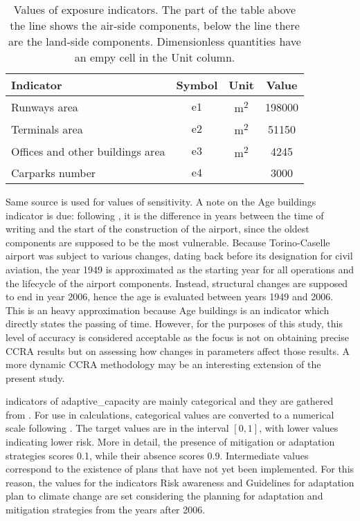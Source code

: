 \begin{table}[h]
  \renewcommand*{\arraystretch}{1.5}
  \centering
  \caption{Values of exposure indicators. The part of the table above the line shows the air-side components, below the line there are the land-side components. Dimensionless quantities have an empy cell in the Unit column.}
  \label{tab:values_exposure}
  \begin{tabular}{p{}ccc}
    Indicator                        & Symbol        & Unit                 & Value  \\
    \hline
    Runways area                     & $\mathrm{e1}$ & \unit{\square\metre} & 198000 \\
    \hline
    Terminals area                   & $\mathrm{e2}$ & \unit{\square\metre} & 51150  \\
    Offices and other buildings area & $\mathrm{e3}$ & \unit{\square\metre} & 4245   \\
    Carparks number                  & $\mathrm{e4}$ &                      & 3000   \\
  \end{tabular}
\end{table}

Same source is used for values of \gls{sensitivity}. A note on the {Age buildings} indicator is due: following \cite[5]{2022DeVivoRiskAssessment}, it is the difference in years between the time of writing and the start of the construction of the airport, since the oldest components are supposed to be the most vulnerable. Because Torino-Caselle airport was subject to various changes, dating back before its designation for civil aviation, the year 1949 is approximated as the starting year for all operations and the lifecycle of the airport components. Instead, structural changes are supposed to end in year 2006, hence the age is evaluated between years 1949 and 2006. This is an heavy approximation because {Age buildings} is an indicator which directly states the passing of time. However, for the purposes of this study, this level of accuracy is considered acceptable as the focus is not on obtaining precise \gls{CCRA} results but on assessing how changes in parameters affect those results.
A more dynamic \gls{CCRA} methodology may be an interesting extension of the present study.

\Glspl{indicator} of \gls{adaptive_capacity} are mainly categorical and they are gathered from \cite[66-79]{2015PudduCorporateSocial}. For use in calculations, categorical values are converted to a numerical scale following \cite[6]{2023DeVivoClimate-RiskAssessment}. The target values are in the interval $[0, 1]$, with lower values indicating lower \gls{risk}. More in detail, the presence of mitigation or adaptation strategies scores \num{0.1}, while their absence scores \num{0.9}. Intermediate values correspond to the existence of plans that have not yet been implemented. For this reason, the values for the indicators {Risk awareness} and {Guidelines for adaptation plan to climate change} are set considering the planning for adaptation and mitigation strategies from the years after 2006.

